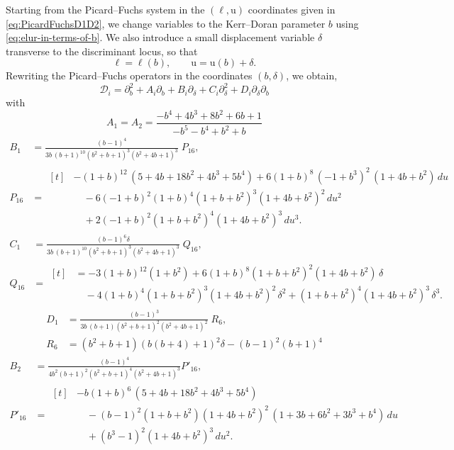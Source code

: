 \documentclass[11pt, a4paper]{article}
\newcommand{\ur}{\mathrm{u}}
\numberwithin{equation}{section}
\begin{document}
Starting from the Picard--Fuchs system in the $(\ell,\ur)$ coordinates given in \cref{eq:PicardFuchsD1D2}, we change variables to the Kerr--Doran parameter $b$ using \cref{eq:elur-in-terms-of-b}. We also introduce a small displacement variable $\delta$ transverse to the discriminant locus, so that
\[
  \ell=\ell(b),\qquad \ur=\ur(b)+\delta.
\]
Rewriting the Picard--Fuchs operators in the coordinates $(b,\delta)$, we obtain,
\begin{equation}
    \mathcal{D}_i = \partial_b^2 + A_i \partial_b  + B_i \partial_{\delta} + C_i \partial_{\delta}^2 + D_i \partial_{\delta} \partial_b
\end{equation}
with
\begin{equation}
    A_1 = A_2 = \frac{-b^4+4 b^3+8 b^2+6 b+1}{-b^5-b^4+b^2+b}
\end{equation}
% 
\begin{align}
B_1 &= \frac{(b-1)^4}{3b\,(b+1)^{10}(b^2+b+1)^3(b^2+4b+1)^3}\;P_{16},\\[2mm]
P_{16} &=
\begin{aligned}[t]
&-(1+b)^{12}\,(5 + 4b + 18b^{2} + 4b^{3} + 5b^{4})
+ 6(1+b)^{8}\,(-1+b^{3})^{2}\,(1+4b+b^{2})\,du \nonumber\\
&\quad - 6(-1+b)^{2}(1+b)^{4}(1+b+b^{2})^{3}(1+4b+b^{2})^{2}\,du^{2} \nonumber\\
&\quad + 2(-1+b)^{2}(1+b+b^{2})^{4}(1+4b+b^{2})^{3}\,du^{3}.
\end{aligned}
\end{align}
% 
\begin{align}
C_1 &= \frac{(b-1)^6 \delta}{3b\,(b+1)^{10}(b^2+b+1)^3(b^2+4b+1)^3}\;Q_{16},\\[2mm]
Q_{16} &=
\begin{aligned}[t]
&= -3(1+b)^{12}(1+b^2)
+ 6(1+b)^8(1+b+b^2)^2(1+4b+b^2)\,\delta \nonumber\\
&\quad - 4(1+b)^4(1+b+b^2)^3(1+4b+b^2)^2\,\delta^2
+ (1+b+b^2)^4(1+4b+b^2)^3\,\delta^3.
\end{aligned}
\end{align}
\begin{align}
D_1 &= \frac{(b-1)^3}{3b\,(b+1)(b^2+b+1)^2(b^2+4b+1)^2}\;R_6,\\[2mm]
R_6 &= (b^2+b+1) (b (b+4)+1)^2 \delta-(b-1)^2 (b+1)^4
\end{align}
% 
\begin{align}
  B_2 &= \frac{(b-1)^4}{4 b^2 (b+1)^2 \left(b^2+b+1\right)^4 \left(b^2+4 b+1\right)^3} P'_{16}, \\[2mm]
  P'_{16} &=
  \begin{aligned}[t]
    &-b(1+b)^{6}\,(5 + 4b + 18b^{2} + 4b^{3} + 5b^{4}) \nonumber\\
    &\quad -(b-1)^{2}(1+b+b^{2})(1+4b+b^{2})^{2}\,(1 + 3b + 6b^{2} + 3b^{3} + b^{4})\,du \nonumber\\
    &\quad + (b^{3}-1)^{2}(1+4b+b^{2})^{3}\,du^{2}.
  \end{aligned}
\end{align}
\end{document}
